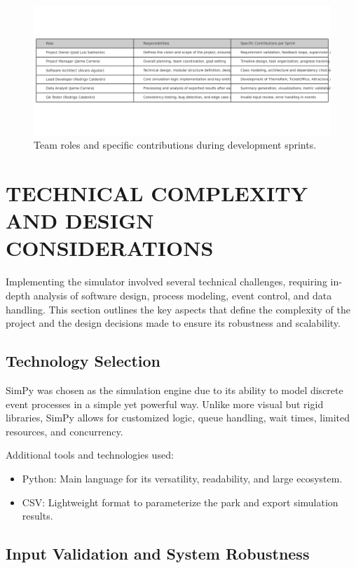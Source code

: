 \documentclass[12pt]{article}
\begin{document}
\begin{figure}[H]
    \centering
    \includegraphics[width=\textwidth]{team_roles_english.png}
    \caption{Team roles and specific contributions during development sprints.}
    \label{fig:team-roles}
\end{figure}


\section{TECHNICAL COMPLEXITY AND DESIGN CONSIDERATIONS}

Implementing the simulator involved several technical challenges, requiring in-depth analysis of software design, process modeling, event control, and data handling. This section outlines the key aspects that define the complexity of the project and the design decisions made to ensure its robustness and scalability.

\subsection{Technology Selection}

SimPy was chosen as the simulation engine due to its ability to model discrete event processes in a simple yet powerful way. Unlike more visual but rigid libraries, SimPy allows for customized logic, queue handling, wait times, limited resources, and concurrency.

Additional tools and technologies used:
\begin{itemize}
    \item Python: Main language for its versatility, readability, and large ecosystem.
    \item CSV: Lightweight format to parameterize the park and export simulation results.
\end{itemize}

\subsection{Input Validation and System Robustness}
\end{document}

